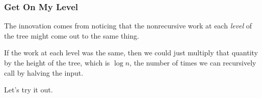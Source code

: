 \documentclass[aspectratio=169, handout]{beamer}
\begin{document}
\begin{frame}[fragile]
  \frametitle{Get On My Level}

  The innovation comes from noticing that the nonrecursive work
  at each \textit{level} of the tree might come out to the same thing.

  \pause
  \vspace{\fill}

  If the work at each level was the same, then we could just multiply
  that quantity by the height of the tree, which is $\log n$, the number
  of times we can recursively call  by halving the input.

  \pause
  \vspace{\fill}

  Let's try it out.
\end{frame}
\end{document}
